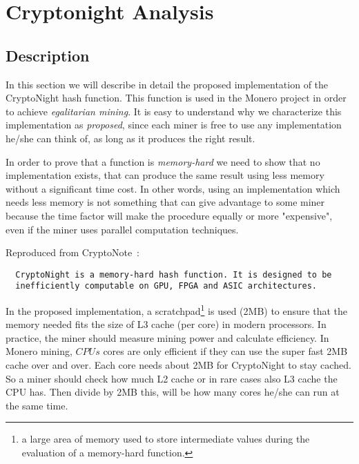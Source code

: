 
\chapter*{Cryptonight Analysis}
%
%
\setcounter{section}{0}
\section{Description}
In this section we will describe in detail the proposed implementation of the CryptoNight hash function. This function is used in the Monero project in order to achieve \emph{egalitarian mining}. It is easy to understand why we characterize this implementation as \emph{proposed}, since each miner is free to use any implementation he/she can think of, as long as it produces the right result.

In order to prove that a function is \emph{memory-hard} we need to show that no implementation exists, that can produce the same result using less memory without a significant time cost. In other words, using an implementation which needs less memory is not something that can give advantage to some miner because the time factor will make the procedure equally or more "expensive", even if the miner uses parallel computation techniques.

\noindent Reproduced from CryptoNote~\cite{cryptonight}:
\begin{verbatim}
  CryptoNight is a memory-hard hash function. It is designed to be
  inefficiently computable on GPU, FPGA and ASIC architectures.
\end{verbatim}
In the proposed implementation, a scratchpad\footnote{a large area of memory used to store intermediate values during the evaluation of a memory-hard function.} is used (2MB) to ensure that the memory needed fits the size of L3 cache (per core) in modern processors. In practice, the miner should measure mining power and calculate efficiency. In Monero mining, $CPUs$ cores are only efficient if they can use the super fast 2MB cache over and over. Each core needs about 2MB for CryptoNight to stay cached. So a miner should check how much L2 cache or in rare cases also L3 cache the CPU has. Then divide by 2MB this, will be how many cores he/she can run at the same time.

